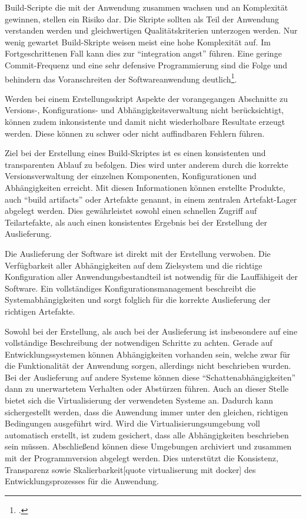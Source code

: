 Build-Scripte die mit der Anwendung zusammen wachsen und an Komplexität gewinnen, stellen ein Risiko dar. Die Skripte sollten als Teil der Anwendung verstanden werden und gleichwertigen Qualitätskriterien unterzogen werden. Nur wenig gewartet Build-Skripte weisen meist eine hohe Komplexität auf. Im Fortgeschrittenen Fall kann dies zur  ``integration angst'' führen. Eine geringe Commit-Frequenz und eine sehr defensive Programmierung sind die Folge und behindern das Voranschreiten der Softwareanwendung deutlich\footcite{ci-is-not-build-systems}.

Werden bei einem Erstellungsskript Aspekte der vorangegangen Abschnitte zu Versions-, Konfigurations- und Abhängigkeitsverwaltung nicht berücksichtigt, können zudem inkonsistente und damit nicht 
wiederholbare Resultate erzeugt werden. Diese können zu schwer oder nicht auffindbaren Fehlern führen.

Ziel bei der Erstellung eines Build-Skriptes ist es einen konsistenten und transparenten Ablauf zu 
befolgen. Dies wird unter anderem durch die korrekte Versionsverwaltung der einzelnen Komponenten, Konfigurationen und 
Abhängigkeiten erreicht. Mit diesen Informationen können erstellte Produkte, auch ``build artifacts'' oder Artefakte 
genannt, in einem zentralen Artefakt-Lager abgelegt werden. Dies gewährleistet sowohl einen schnellen Zugriff auf 
Teilartefakte, als auch einen konsistentes Ergebnis bei der Erstellung der Auslieferung.

Die Auslieferung der Software ist direkt mit der Erstellung verwoben. Die Verfügbarkeit aller Abhängigkeiten auf dem 
Zielsystem und die richtige Konfiguration aller Anwendungsbestandteil ist notwendig für die Lauffähigeit der Software. 
Ein vollständiges Konfigurationsmanagement beschreibt die Systemabhängigkeiten und sorgt folglich für die korrekte 
Auslieferung der richtigen Artefakte.

Sowohl bei der Erstellung, als auch bei der Auslieferung ist insbesondere auf eine vollständige Beschreibung der 
notwendigen Schritte zu achten. Gerade auf Entwicklungssystemen können Abhängigkeiten vorhanden sein, welche zwar für die 
Funktionalität der Anwendung sorgen, allerdings nicht beschrieben wurden. Bei der Auslieferung auf andere Systeme können 
diese ``Schattenabhängigkeiten'' dann zu unerwartetem Verhalten oder Abstürzen führen. 
Auch an dieser Stelle bietet sich die Virtualisierung der verwendeten Systeme an. Dadurch kann sichergestellt werden, 
dass die Anwendung immer unter den gleichen, richtigen Bedingungen ausgeführt wird. Wird die Virtualisierungsumgebung 
voll automatisch erstellt, ist zudem gesichert, dass alle Abhängigkeiten beschrieben sein müssen.
Abschließend können diese Umgebungen archiviert und zusammen mit der Programmversion abgelegt werden. Dies unterstützt 
die Konsistenz, Transparenz sowie Skalierbarkeit[quote virtualiserung mit docker] des Entwicklungsprozesses für die 
Anwendung.


